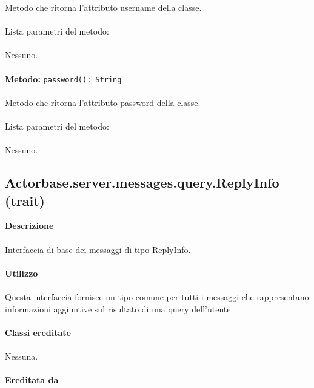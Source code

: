 \documentclass[a4paper]{article}
\begin{document}
		Metodo che ritorna l'attributo username della classe.
			\\ \\
		Lista parametri del metodo:
			\\ \\
			Nessuno.
			\\ \\		
		\textbf{Metodo: } \texttt{password(): String}
			\\ \\
		Metodo che ritorna l'attributo password della classe.
			\\ \\
		Lista parametri del metodo:
			\\ \\
			Nessuno.
	
	\subsection{Actorbase.server.messages.query.ReplyInfo (trait)}
			\textbf{Descrizione}
			\\ \\
			Interfaccia di base dei messaggi di tipo ReplyInfo.
			\\ \\
		\textbf{Utilizzo}
			\\ \\
			Questa interfaccia fornisce un tipo comune per tutti i messaggi che rappresentano informazioni aggiuntive sul risultato di una query dell'utente.
			\\ \\
		\textbf{Classi ereditate}
			\\ \\
			Nessuna.
			\\ \\
		\textbf{Ereditata da}
\end{document}
